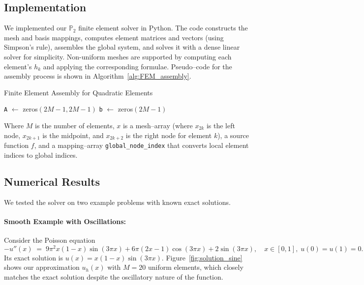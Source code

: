 \documentclass[a4paper,10pt]{article}
\begin{document}
\subsection{Implementation}
We implemented our \(\mathbb{P}_2\) finite element solver in Python. The code constructs
the mesh and basis mappings, computes element matrices and vectors (using Simpson's rule),
assembles the global system, and solves it with a dense linear solver for simplicity.
Non-uniform meshes are supported by computing each element's \(h_k\) and applying the
corresponding formulae. Pseudo--code for the assembly process is shown in Algorithm~\ref{alg:FEM_assembly}.

\begin{algorithm}[H]
	\caption{Finite Element Assembly for Quadratic Elements}
	\label{alg:FEM_assembly}
	\BlankLine
	\texttt{A} \(\leftarrow\) zeros\((2M-1, 2M-1)\)\;
	\texttt{b} \(\leftarrow\) zeros\((2M-1)\)\;
	\BlankLine
	\BlankLine
\end{algorithm}

Where $M$ is the number of elements, $x$ is a mesh--array  (where $x_{2k}$ is the left node, $x_{2k+1}$ is the midpoint, and $x_{2k+2}$ is the right node for element $k$), a source function $f$, and a mapping--array \texttt{global\_node\_index} that converts local element indices to global indices.

\subsection{Numerical Results}
We tested the solver on two example problems with known exact solutions.

\paragraph{Smooth Example with Oscillations:}
Consider the Poisson equation
\[
	-u''(x) \;=\; 9\pi^2 x(1-x)\sin(3\pi x) + 6\pi(2x-1)\cos(3\pi x) + 2\sin(3\pi x), \quad x \in [0,1],\; u(0)=u(1)=0.
\]
Its exact solution is \(u(x) = x(1-x)\sin(3\pi x)\). Figure~\ref{fig:solution_sine}
shows our approximation \(u_h(x)\) with \(M=20\) uniform elements, which closely
matches the exact solution despite the oscillatory nature of the function.
\end{document}
